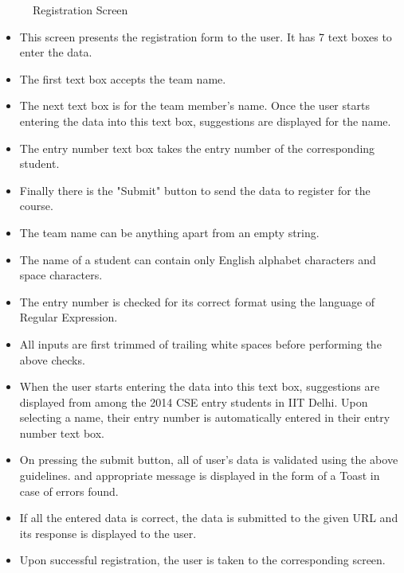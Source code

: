 \documentclass[12pt]{article}
\begin{document}
\begin{figure}[!ht]
	\centering
	\caption{Registration Screen}
\end{figure}



\begin{itemize}
\setlength\itemsep{-0.4em}
\item This screen presents the registration form to the user. It has 7 text boxes to enter the data.
\item The first text box accepts the team name.
\item The next text box is for the team member's name. Once the user starts entering the data into this text box, suggestions are displayed for the name.
\item The entry number text box takes the entry number of the corresponding student.
\item Finally there is the "Submit" button to send the data to register for the course.
\end{itemize}

\begin{itemize}
\setlength\itemsep{-0.4em}
\item The team name can be anything apart from an empty string.
\item The name of a student can contain only English alphabet characters and space characters.
\item The entry number is checked for its correct format using the language of Regular Expression.
\item All inputs are first trimmed of trailing white spaces before performing the above checks.
\end{itemize}

\begin{itemize}
\setlength\itemsep{-0.4em}
\item When the user starts entering the data into this text box, suggestions are displayed from among the 2014 CSE entry students in IIT Delhi. Upon selecting a name, their entry number is automatically entered in their entry number text box.
\item On pressing the submit button, all of user's data is validated using the above guidelines. and appropriate message is displayed in the form of a Toast in case of errors found.
\item If all the entered data is correct, the data is submitted to the given URL and its response is displayed to the user.
\item Upon successful registration, the user is taken to the corresponding screen.
\end{itemize}
\end{document}
